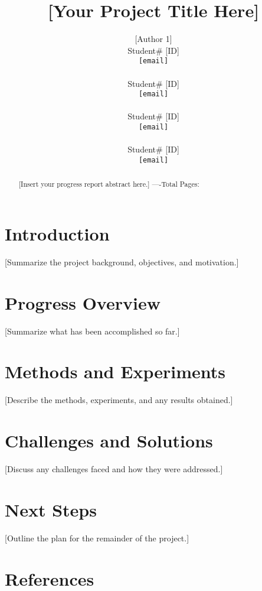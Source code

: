\documentclass{article} %
\title{[Your Project Title Here]}
\author{[Author 1]\\
Student\# [ID]\\
\texttt{[email]} \\
\And
[Author 2]\\
Student\# [ID]\\
\texttt{[email]} \\
\AND
[Author 3]\\
Student\# [ID]\\
\texttt{[email]} \\
\And
[Author 4]\\
Student\# [ID]\\
\texttt{[email]} \\
}
\begin{document}
\maketitle

\begin{abstract}
[Insert your progress report abstract here.]
----Total Pages: \pageref{last_page}
\end{abstract}


\section{Introduction}
[Summarize the project background, objectives, and motivation.]

\section{Progress Overview}
[Summarize what has been accomplished so far.]

\section{Methods and Experiments}
[Describe the methods, experiments, and any results obtained.]

\section{Challenges and Solutions}
[Discuss any challenges faced and how they were addressed.]

\section{Next Steps}
[Outline the plan for the remainder of the project.]

\section{References}



\label{last_page}
\end{document}
